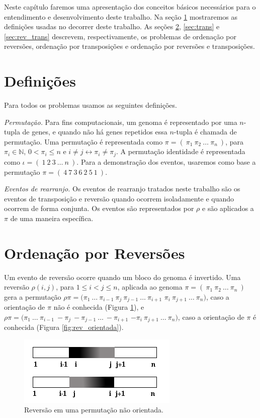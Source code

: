 Neste capítulo faremos uma apresentação dos conceitos básicos
necessários para o entendimento e desenvolvimento deste trabalho. Na
seção \ref{sec:defin} mostraremos as definições usadas no decorrer
deste trabalho. As seções \ref{sec:rev}, \ref{sec:trans}
e \ref{sec:rev_trans} descrevem, respectivamente, os problemas de
ordenação por reversões, ordenação por transposições e ordenação por
reversões e transposições.

\section{Definições}
\label{sec:defin}
Para todos os problemas usamos as seguintes definições.

\textit{Permutação.} 
Para fins computacionais, um genoma é representado por uma $n$-tupla
de genes, e quando não há genes repetidos essa $n$-tupla é chamada de
permutação. Uma permutação é representada como $\pi =
(~\pi_{1}~\pi_{2}~\ldots~\pi_{n}~)$, para $\pi_{i} \in \mathbb{N}$, $0
< \pi_{i} \leq n$ e $i \neq j \leftrightarrow \pi_{i} \neq \pi_{j}$. A
permutação identidade é representada como $\iota =
(~1~2~3~\ldots~n~)$. Para a demonstração dos eventos, usaremos como
base a permutação $\pi = (~4~7~3~6~2~5~1~)$.

\textit{Eventos de rearranjo.}
Os eventos de rearranjo tratados neste trabalho são os eventos de
transposição e reversão quando ocorrem isoladamente e quando ocorrem
de forma conjunta. Os eventos são representados por $\rho$ e são
aplicados a $\pi$ de uma maneira específica.

\section{Ordenação por Reversões}
\label{sec:rev}
Um evento de reversão ocorre quando um bloco do genoma é
invertido. Uma reversão $\rho(i, j)$, para $1 \leq i < j \leq n$,
aplicada ao genoma $\pi = (~\pi_{1}~\pi_{2}~\ldots~\pi_{n}~)$ gera a
permutação $\rho\pi =
(\pi_{1}~\ldots~\pi_{i-1}~\pi_{j}~\pi_{j-1}~\ldots~\pi_{i+1}$
$\pi_{i}~ \pi_{j+1}~\ldots~\pi_{n})$, caso a orientação de $\pi$ não é
conhecida (Figura \ref{fig:rev_nao_orientada}), e $\rho\pi =
(\pi_{1}~\ldots~\pi_{i-1}~-\pi_{j}~-\pi_{j-1}~\ldots~-\pi_{i+1}$
$-\pi_{i}~ \pi_{j+1}~\ldots~\pi_{n})$, caso a orientação de $\pi$ é
conhecida (Figura \ref{fig:rev_orientada}). 

\begin{figure}
  \centering
  \includegraphics{images/rev_nao_orientada.png} 
  \caption{Reversão em uma permutação não orientada.}
  \label{fig:rev_nao_orientada}
\end{figure}

